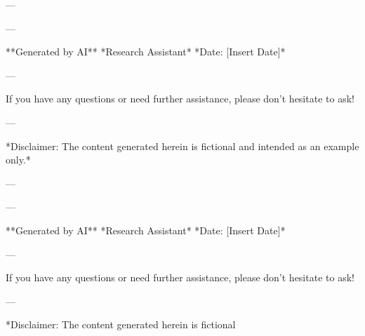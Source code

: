 --- 

--- 

**Generated by AI** 
*Research Assistant* 
*Date: [Insert Date]*

--- 

If you have any questions or need further assistance, please don't hesitate to ask! 

--- 

*Disclaimer: The content generated herein is fictional and intended as an example only.* 

--- 

--- 

**Generated by AI** 
*Research Assistant* 
*Date: [Insert Date]*

--- 

If you have any questions or need further assistance, please don't hesitate to ask! 

--- 

*Disclaimer: The content generated herein is fictional